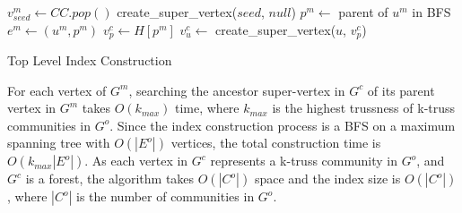 \begin{algorithm}
	\BlankLine
	 {
		$v^{m}_{seed} \gets CC.pop()$\;
		create\_super\_vertex($seed$, $null$)\;
		 {
			$p^m \gets$ parent of $u^m$ in BFS\;
			$e^m \gets (u^m, p^m)$\;
			$v^{c}_{p} \gets H[p^m]$\;
			\lWhile{$\tau_{v^{c}_{p}} > \tau_{e^m}$}{
					${v^{c}_{p}}^{\prime} \gets v^{c}_{p}$, $v^{c}_{p} \gets v^{c}_{p}.parent$
			}
			 {
				 {
					$v^{c}_{u} \gets$ create\_super\_vertex($u$, $v^{c}_{p}$)\;
				}
			}
		}
	}
	\caption{Top Level Index Construction}
	\label{alg:\treeindex{}_construction}
\end{algorithm}

For each vertex of $G^m$, searching the ancestor super-vertex in $G^c$ of its parent vertex in $G^m$ takes $O(k_{max})$ time, where $k_{max}$ is the highest trussness of k-truss communities in $G^o$. Since the index construction process is a BFS on a maximum spanning tree with $O(|E^o|)$ vertices, the total construction time is $O(k_{max}|E^o|)$. As each vertex in $G^c$ represents a k-truss community in $G^o$, and $G^c$ is a forest, the algorithm takes $O(|C^o|)$ space and the index size is $O(|C^o|)$, where $|C^o|$ is the number of communities in $G^o$. 
%
%
